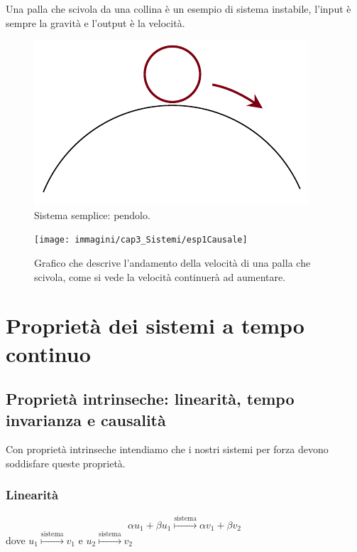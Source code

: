 	\begin{nexample}
			Una palla che scivola da una collina è un esempio di sistema instabile, l'input è sempre la gravità e l'output è la velocità.
	
		\begin{figure}[H]
			\centering
			\includegraphics[scale=0.5]{immagini/cap3_Sistemi/pallaScivola}
			\caption{ Sistema semplice: pendolo. }
			\label{fig: pallaScivola}
		\end{figure}
	
		\begin{figure}[H]
			\centering
			\texttt{[image: immagini/cap3\_Sistemi/esp1Causale]}
			\caption{ Grafico che descrive l'andamento della velocità di una palla che scivola, come si vede la velocità continuerà ad aumentare. }
			\label{fig: esp1Causale}
		\end{figure}

	\end{nexample}


\section{Proprietà dei sistemi a tempo continuo}
	
	\subsection{Proprietà intrinseche: linearità, tempo invarianza e causalità}
	Con proprietà intrinseche intendiamo che i nostri sistemi per forza devono soddisfare queste proprietà.
		
		\subsubsection{Linearità}\label{sist_prop_Lin} 
			\[
			\alpha u_1+\beta u_1 \overset{\text{sistema}}{\longmapsto} \alpha v_1+\beta v_2
			\]
			dove $ u_1 \overset{\text{sistema}}{\longmapsto} v_1$ e $u_2\overset{\text{sistema}}{\longmapsto} v_2$
			
